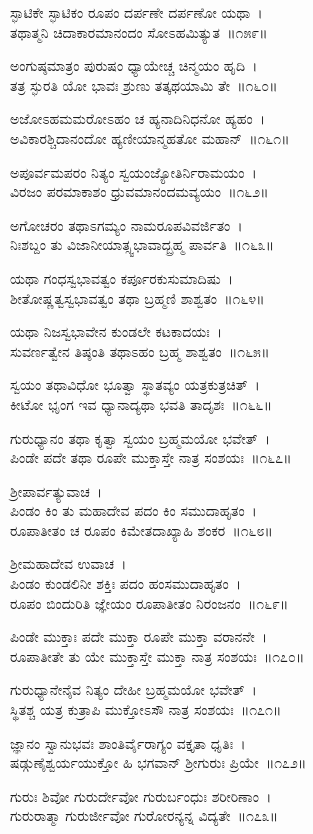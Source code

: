 ಸ್ಫಾಟಿಕೇ ಸ್ಫಾಟಿಕಂ ರೂಪಂ ದರ್ಪಣೇ ದರ್ಪಣೋ ಯಥಾ~।\\
ತಥಾತ್ಮನಿ ಚಿದಾಕಾರಮಾನಂದಂ ಸೋಽಹಮಿತ್ಯುತ~॥೧೫೯॥

ಅಂಗುಷ್ಠಮಾತ್ರಂ ಪುರುಷಂ ಧ್ಯಾಯೇಚ್ಚ ಚಿನ್ಮಯಂ ಹೃದಿ~।\\
ತತ್ರ ಸ್ಫುರತಿ ಯೋ ಭಾವಃ ಶ್ರುಣು ತತ್ಕಥಯಾಮಿ ತೇ~॥೧೬೦॥

ಅಜೋಽಹಮಮರೋಽಹಂ ಚ ಹ್ಯನಾದಿನಿಧನೋ ಹ್ಯಹಂ~।\\
ಅವಿಕಾರಶ್ಚಿದಾನಂದೋ ಹ್ಯಣೀಯಾನ್ಮಹತೋ ಮಹಾನ್~॥೧೬೧॥

ಅಪೂರ್ವಮಪರಂ ನಿತ್ಯಂ ಸ್ವಯಂಜ್ಯೋತಿರ್ನಿರಾಮಯಂ~।\\
ವಿರಜಂ ಪರಮಾಕಾಶಂ ಧ್ರುವಮಾನಂದಮವ್ಯಯಂ~॥೧೬೨॥

ಅಗೋಚರಂ ತಥಾಽಗಮ್ಯಂ ನಾಮರೂಪವಿವರ್ಜಿತಂ~।\\
ನಿಃಶಬ್ದಂ ತು ವಿಜಾನೀಯಾತ್ಸ್ವಭಾವಾದ್ಬ್ರಹ್ಮ ಪಾರ್ವತಿ~॥೧೬೩॥

ಯಥಾ ಗಂಧಸ್ವಭಾವತ್ವಂ ಕರ್ಪೂರಕುಸುಮಾದಿಷು~।\\
ಶೀತೋಷ್ಣತ್ವಸ್ವಭಾವತ್ವಂ ತಥಾ ಬ್ರಹ್ಮಣಿ ಶಾಶ್ವತಂ~॥೧೬೪॥

ಯಥಾ ನಿಜಸ್ವಭಾವೇನ ಕುಂಡಲೇ ಕಟಕಾದಯಃ~।\\
ಸುವರ್ಣತ್ವೇನ ತಿಷ್ಠಂತಿ ತಥಾಽಹಂ ಬ್ರಹ್ಮ ಶಾಶ್ವತಂ~॥೧೬೫॥

ಸ್ವಯಂ ತಥಾವಿಧೋ ಭೂತ್ವಾ ಸ್ಥಾತವ್ಯಂ ಯತ್ರಕುತ್ರಚಿತ್~।\\
ಕೀಟೋ ಭೃಂಗ ಇವ ಧ್ಯಾನಾದ್ಯಥಾ ಭವತಿ ತಾದೃಶಃ~॥೧೬೬॥

ಗುರುಧ್ಯಾನಂ ತಥಾ ಕೃತ್ವಾ ಸ್ವಯಂ ಬ್ರಹ್ಮಮಯೋ ಭವೇತ್~।\\
ಪಿಂಡೇ ಪದೇ ತಥಾ ರೂಪೇ ಮುಕ್ತಾಸ್ತೇ ನಾತ್ರ ಸಂಶಯಃ~॥೧೬೭॥

ಶ್ರೀಪಾರ್ವತ್ಯುವಾಚ~।\\
ಪಿಂಡಂ ಕಿಂ ತು ಮಹಾದೇವ ಪದಂ ಕಿಂ ಸಮುದಾಹೃತಂ~।\\
ರೂಪಾತೀತಂ ಚ ರೂಪಂ ಕಿಮೇತದಾಖ್ಯಾಹಿ ಶಂಕರ~॥೧೬೮॥

ಶ್ರೀಮಹಾದೇವ ಉವಾಚ~।\\
ಪಿಂಡಂ ಕುಂಡಲಿನೀ ಶಕ್ತಿಃ ಪದಂ ಹಂಸಮುದಾಹೃತಂ~।\\
ರೂಪಂ ಬಿಂದುರಿತಿ ಜ್ಞೇಯಂ ರೂಪಾತೀತಂ ನಿರಂಜನಂ~॥೧೬೯॥

ಪಿಂಡೇ ಮುಕ್ತಾಃ ಪದೇ ಮುಕ್ತಾ ರೂಪೇ ಮುಕ್ತಾ ವರಾನನೇ~।\\
ರೂಪಾತೀತೇ ತು ಯೇ ಮುಕ್ತಾಸ್ತೇ ಮುಕ್ತಾ ನಾತ್ರ ಸಂಶಯಃ~॥೧೭೦॥

ಗುರುಧ್ಯಾನೇನೈವ ನಿತ್ಯಂ ದೇಹೀ ಬ್ರಹ್ಮಮಯೋ ಭವೇತ್~।\\
ಸ್ಥಿತಶ್ಚ ಯತ್ರ ಕುತ್ರಾಪಿ ಮುಕ್ತೋಽಸೌ ನಾತ್ರ ಸಂಶಯಃ~॥೧೭೧॥

ಜ್ಞಾನಂ ಸ್ವಾನುಭವಃ ಶಾಂತಿರ್ವೈರಾಗ್ಯಂ ವಕ್ತೃತಾ ಧೃತಿಃ~।\\
ಷಡ್ಗುಣೈಶ್ವರ್ಯಯುಕ್ತೋ ಹಿ ಭಗವಾನ್ ಶ್ರೀಗುರುಃ ಪ್ರಿಯೇ~॥೧೭೨॥

ಗುರುಃ ಶಿವೋ ಗುರುರ್ದೇವೋ ಗುರುರ್ಬಂಧುಃ ಶರೀರಿಣಾಂ~।\\
ಗುರುರಾತ್ಮಾ ಗುರುರ್ಜೀವೋ ಗುರೋರನ್ಯನ್ನ ವಿದ್ಯತೇ~॥೧೭೩॥

